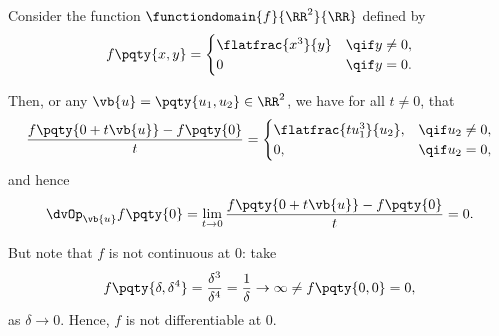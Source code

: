 \begin{example}
    Consider the function \(\functiondomain{f}{\RR^2}{\RR}\) defined by
    \[
        f\pqty{x, y} = \begin{cases}
            \flatfrac{x^3}{y} &\qif y \neq 0, \\
            0 &\qif y = 0.
        \end{cases}
    \]

    Then, or any \(\vb{u} = \pqty{u_1, u_2} \in \RR^2\), we have for all \(t \neq 0\), that
    \[
        \frac{f\pqty{0 + t \vb{u}} - f\pqty{0}}{t} = \begin{cases}
            \flatfrac{t u_1^3}{u_2}, &\qif u_2 \neq 0, \\
            0, &\qif u_2 = 0,
        \end{cases}
    \]
    and hence 
    \[
        \dvOp_{\vb{u}} f\pqty{0} = \lim_{t \to 0} \frac{f\pqty{0 + t \vb{u}} - f\pqty{0}}{t} = 0.
    \]

    But note that \(f\) is not continuous at \(0\): take
    \[
        f\pqty{\delta, \delta^4} = \frac{\delta^3}{\delta^4} = \frac{1}{\delta} \to \infty \neq f\pqty{0, 0} = 0,
    \]
    as \(\delta \to 0\). Hence, \(f\) is not differentiable at \(0\).
\end{example}

